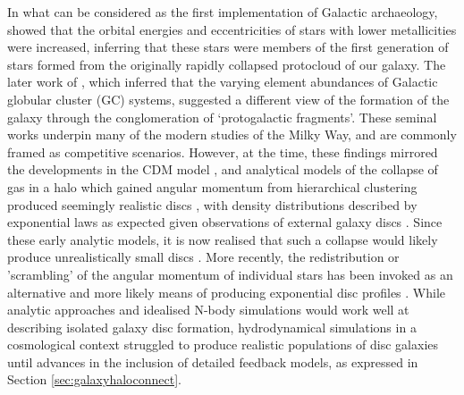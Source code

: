 In what can be considered as the first implementation of Galactic archaeology, \citet{1962ApJ...136..748E} showed that the orbital energies and eccentricities of stars with lower metallicities were increased, inferring that these stars were members of the first generation of stars formed from the originally rapidly collapsed protocloud of our galaxy. The later work of \citet{1978ApJ...225..357S}, which inferred that the varying element abundances of Galactic globular cluster (GC) systems, suggested a different view of the formation of the galaxy through the conglomeration of `protogalactic fragments'. These seminal works underpin many of the modern studies of the Milky Way, and are commonly framed as competitive scenarios. However, at the time, these findings mirrored the developments in the CDM model \citep{1978MNRAS.183..341W}, and analytical models of the collapse of gas in a halo which gained angular momentum from hierarchical clustering produced seemingly realistic discs \citep{1980MNRAS.193..189F}, with density distributions described by exponential laws as expected given observations of external galaxy discs \citep[e.g.][]{1959HDP....53..311D,1970ApJ...160..811F,1983MNRAS.202.1025G,2006A&A...454..759P}. Since these early analytic models, it is now realised that such a collapse would likely produce unrealistically small discs \citep[e.g.][]{2000MNRAS.317..697E}. More recently, the redistribution or 'scrambling' of the angular momentum of individual stars has been invoked as an alternative and more likely means of producing exponential disc profiles \citep[e.g.][]{2013ApJ...775L..35E,2016ApJ...830..115E,2016arXiv161203171H}. While analytic approaches and idealised N-body simulations would work well at describing isolated galaxy disc formation, hydrodynamical simulations in a cosmological context struggled to produce realistic populations of disc galaxies until advances in the inclusion of detailed feedback models, as expressed in Section \ref{sec:galaxyhaloconnect}. 

